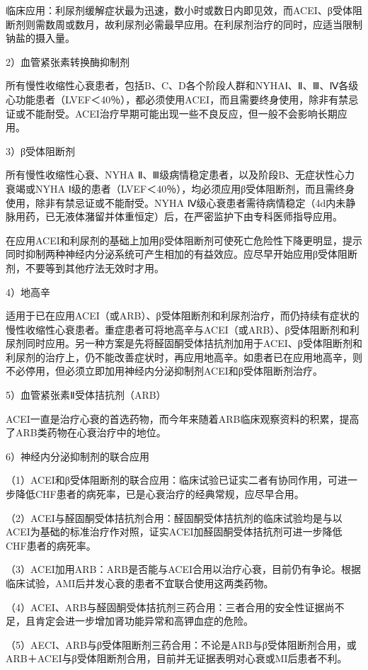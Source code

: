 临床应用：利尿剂缓解症状最为迅速，数小时或数日内即见效，而ACEI、β受体阻断剂则需数周或数月，故利尿剂必需最早应用。在利尿剂治疗的同时，应适当限制钠盐的摄入量。

2）血管紧张素转换酶抑制剂

所有慢性收缩性心衰患者，包括B、C、D各个阶段人群和NYHAⅠ、Ⅱ、Ⅲ、Ⅳ各级心功能患者（LVEF＜40％），都必须使用ACEI，而且需要终身使用，除非有禁忌证或不能耐受。ACEI治疗早期可能出现一些不良反应，但一般不会影响长期应用。

3）β受体阻断剂

所有慢性收缩性心衰、NYHA
Ⅱ、Ⅲ级病情稳定患者，以及阶段B、无症状性心力衰竭或NYHA
Ⅰ级的患者（LVEF＜40％），均必须应用β受体阻断剂，而且需终身使用，除非有禁忌证或不能耐受。NYHA
Ⅳ级心衰患者需待病情稳定（4d内未静脉用药，已无液体潴留并体重恒定）后，在严密监护下由专科医师指导应用。

在应用ACEI和利尿剂的基础上加用β受体阻断剂可使死亡危险性下降更明显，提示同时抑制两种神经内分泌系统可产生相加的有益效应。应尽早开始应用β受体阻断剂，不要等到其他疗法无效时才用。

4）地高辛

适用于已在应用ACEI（或ARB）、β受体阻断剂和利尿剂治疗，而仍持续有症状的慢性收缩性心衰患者。重症患者可将地高辛与ACEI（或ARB）、β受体阻断剂和利尿剂同时应用。另一种方案是先将醛固酮受体拮抗剂加用于ACEI、β受体阻断剂和利尿剂的治疗上，仍不能改善症状时，再应用地高辛。如患者已在应用地高辛，则不必停用，但必须立即加用神经内分泌抑制剂ACEI和β受体阻断剂治疗。

5）血管紧张素Ⅱ受体拮抗剂（ARB）

ACEI一直是治疗心衰的首选药物，而今年来随着ARB临床观察资料的积累，提高了ARB类药物在心衰治疗中的地位。

6）神经内分泌抑制剂的联合应用

（1）ACEI和β受体阻断剂的联合应用：临床试验已证实二者有协同作用，可进一步降低CHF患者的病死率，已是心衰治疗的经典常规，应尽早合用。

（2）ACEI与醛固酮受体拮抗剂合用：醛固酮受体拮抗剂的临床试验均是与以ACEI为基础的标准治疗作对照，证实ACEI加醛固酮受体拮抗剂可进一步降低CHF患者的病死率。

（3）ACEI加用ARB：ARB是否能与ACEI合用以治疗心衰，目前仍有争论。根据临床试验，AMI后并发心衰的患者不宜联合使用这两类药物。

（4）ACEI、ARB与醛固酮受体拮抗剂三药合用：三者合用的安全性证据尚不足，且肯定会进一步增加肾功能异常和高钾血症的危险。

（5）AECI、ARB与β受体阻断剂三药合用：不论是ARB与β受体阻断剂合用，或ARB＋ACEI与β受体阻断剂合用，目前并无证据表明对心衰或MI后患者不利。